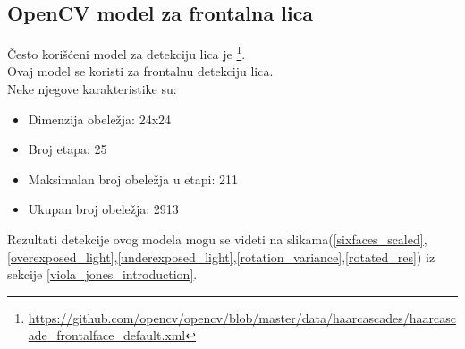 \subsection{OpenCV model za frontalna lica} \label{haarcascade_frontal_sec}

Često korišćeni model za detekciju lica je
\texttt{}\footnote{\url{https://github.com/opencv/opencv/blob/master/data/haarcascades/haarcascade_frontalface_default.xml}}. \\
Ovaj model se koristi za frontalnu detekciju lica. \\
Neke njegove karakteristike su:
\begin{itemize}
\item Dimenzija obeležja: 24x24
\item Broj etapa: 25
\item Maksimalan broj obeležja u etapi: 211
\item Ukupan broj obeležja: 2913
\end{itemize}

\noindent
Rezultati detekcije ovog modela mogu se videti na
slikama(\ref{sixfaces_scaled},\ref{overexposed_light},\ref{underexposed_light},\ref{rotation_variance},\ref{rotated_res})
iz sekcije \ref{viola_jones_introduction}.